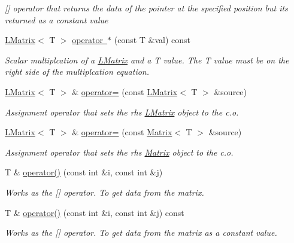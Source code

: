 \begin{DoxyCompactItemize}
\begin{DoxyCompactList}\small\item\em \mbox{[}\mbox{]} operator that returns the data of the pointer at the specified position but its returned as a constant value \end{DoxyCompactList}\item 
\mbox{\hyperlink{class_l_matrix}{L\+Matrix}}$<$ T $>$ \mbox{\hyperlink{class_l_matrix_ac8df9082c434b41a98d26defb95ea388}{operator $\ast$}} (const T \&val) const
\begin{DoxyCompactList}\small\item\em Scalar multiplcation of a \mbox{\hyperlink{class_l_matrix}{L\+Matrix}} and a T value. The T value must be on the right side of the multiplcation equation. \end{DoxyCompactList}\item 
\mbox{\hyperlink{class_l_matrix}{L\+Matrix}}$<$ T $>$ \& \mbox{\hyperlink{class_l_matrix_ad4feb8e3706e9ce8fdb07e63d985f52f}{operator=}} (const \mbox{\hyperlink{class_l_matrix}{L\+Matrix}}$<$ T $>$ \&source)
\begin{DoxyCompactList}\small\item\em Assignment operator that sets the rhs \mbox{\hyperlink{class_l_matrix}{L\+Matrix}} object to the c.\+o. \end{DoxyCompactList}\item 
\mbox{\hyperlink{class_l_matrix}{L\+Matrix}}$<$ T $>$ \& \mbox{\hyperlink{class_l_matrix_a4417a98f81bcd9797241cf658b8ba400}{operator=}} (const \mbox{\hyperlink{class_matrix}{Matrix}}$<$ T $>$ \&source)
\begin{DoxyCompactList}\small\item\em Assignment operator that sets the rhs \mbox{\hyperlink{class_matrix}{Matrix}} object to the c.\+o. \end{DoxyCompactList}\item 
T \& \mbox{\hyperlink{class_l_matrix_aa0b1bc37d56538dbdd4fcb3b88dcc3ec}{operator()}} (const int \&i, const int \&j)
\begin{DoxyCompactList}\small\item\em Works as the \mbox{[}\mbox{]} operator. To get data from the matrix. \end{DoxyCompactList}\item 
T \& \mbox{\hyperlink{class_l_matrix_ae9d404d99117892edd2fbfddfaf929f5}{operator()}} (const int \&i, const int \&j) const
\begin{DoxyCompactList}\small\item\em Works as the \mbox{[}\mbox{]} operator. To get data from the matrix as a constant value. \end{DoxyCompactList}\end{DoxyCompactItemize}


